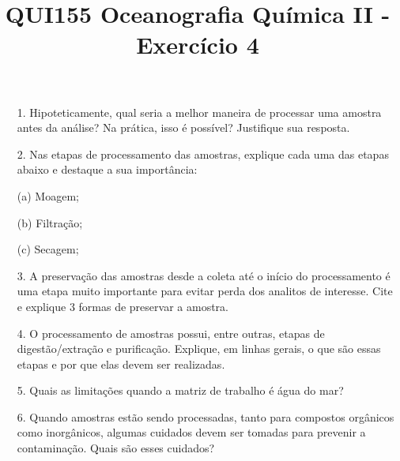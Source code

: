\documentclass[a4paper,10pt]{article}
\title{QUI155 Oceanografia Química II - Exercício 4}
\author{\vspace{-10ex}}
\date{\vspace{-10ex}}
\begin{document}
  \maketitle
  \onehalfspace

  \begin{itemize}
  
    \item[1.] Hipoteticamente, qual seria a melhor maneira de processar uma amostra antes da análise? Na prática, isso é possível? Justifique sua resposta.
    
    \item[2.] Nas etapas de processamento das amostras, explique cada uma das etapas abaixo e destaque a sua importância:
      \item[(a)] Moagem;
      \item[(b)] Filtração;
      \item[(c)] Secagem;
    
    \item[3.] A preservação das amostras desde a coleta até o início do processamento é uma etapa muito importante para evitar perda dos analitos de interesse. Cite e explique 3 formas de preservar a amostra.
    
    \item[4.] O processamento de amostras possui, entre outras, etapas de digestão/extração e purificação. Explique, em linhas gerais, o que são essas etapas e por que elas devem ser realizadas.
    
    \item[5.] Quais as limitações quando a matriz de trabalho é água do mar? 
    
    \item[6.] Quando amostras estão sendo processadas, tanto para compostos orgânicos como inorgânicos, algumas cuidados devem ser tomadas para prevenir a  contaminação. Quais são esses cuidados?
  
  \end{itemize}


\end{document}
